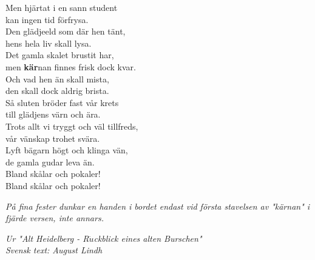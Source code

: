 \documentclass[a6paper,10pt]{article}
\begin{document}
\newpage
\setlength{\oddsidemargin}{-0.47in}
\noindent
Men hjärtat i en sann student\\
kan ingen tid förfrysa.\\
Den glädjeeld som där hen tänt,\\
hens hela liv skall lysa.\\
Det gamla skalet brustit har,\\
men \textbf{kär}nan finnes frisk dock kvar.\\
Och vad hen än skall mista,\\
den skall dock aldrig brista.
\vspace{5pt}\\
Så sluten bröder fast vår krets\\
till glädjens värn och ära.\\
Trots allt vi tryggt och väl tillfreds,\\
vår vänskap trohet svära.\\
Lyft bägarn högt och klinga vän,\\
de gamla gudar leva än.\\
Bland skålar och pokaler!\\
Bland skålar och pokaler! 
\begin{center}
\textit{På fina fester dunkar en handen i bordet endast vid första stavelsen av "kärnan" i fjärde versen, inte annars.}
\end{center}
\begin{flushright}
\textit{Ur "Alt Heidelberg - R$\ddot{u}$ckblick eines alten Burschen"\\
Svensk text: August Lindh}
\end{flushright}
\end{document}
